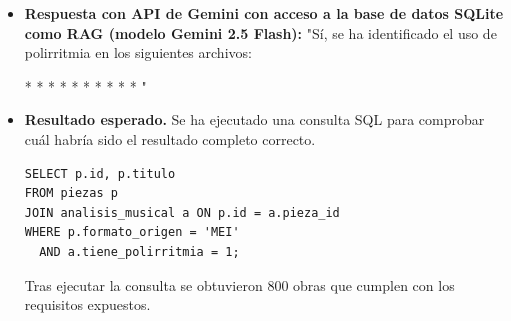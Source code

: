 \begin{itemize}
Es importante mencionar que la polirritmia puede ser difícil de detectar en archivos MEI, especialmente si los compositores utilizan técnicas avanzadas como la ""polirritmia disfrazada"" o la ""polirritmia intercalada"". Sin embargo, en este caso específico, no hay evidencia de uso de polirritmia."
\item \textbf{Respuesta con API de Gemini con acceso a la base de datos SQLite como RAG (modelo Gemini 2.5 Flash):} "Sí, se ha identificado el uso de polirritmia en los siguientes archivos:

* \texttt{}
* \texttt{}
* \texttt{}
* \texttt{}
* \texttt{}
* \texttt{}
* \texttt{}
* \texttt{}
* \texttt{}
* \texttt{}"
\item \textbf{Resultado esperado.} Se ha ejecutado una consulta SQL para comprobar cuál habría sido el resultado completo correcto.
    \begin{verbatim}
SELECT p.id, p.titulo
FROM piezas p
JOIN analisis_musical a ON p.id = a.pieza_id
WHERE p.formato_origen = 'MEI'
  AND a.tiene_polirritmia = 1;
    \end{verbatim}    
    Tras ejecutar la consulta se obtuvieron 800 obras que cumplen con los requisitos expuestos.


\end{itemize}
